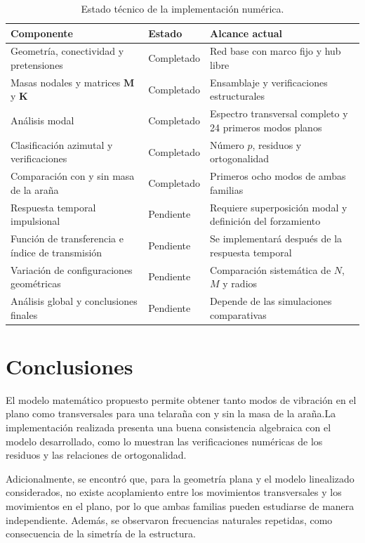 \documentclass[11pt,letterpaper]{article}
\begin{document}
\begin{table}[H]
\centering
\small
\caption{Estado técnico de la implementación numérica.}
\label{tab:estado}
\begin{tabularx}{0.96\textwidth}{@{}X p{2.5cm} X@{}}
\toprule
Componente & Estado & Alcance actual \\
\midrule
Geometría, conectividad y pretensiones & Completado & Red base con marco fijo y hub libre \\
Masas nodales y matrices $\mathbf M$ y $\mathbf K$ & Completado & Ensamblaje y verificaciones estructurales \\
Análisis modal & Completado & Espectro transversal completo y 24 primeros modos planos \\
Clasificación azimutal y verificaciones & Completado & Número $p$, residuos y ortogonalidad \\
Comparación con y sin masa de la araña & Completado & Primeros ocho modos de ambas familias \\
Respuesta temporal impulsional & Pendiente & Requiere superposición modal y definición del forzamiento \\
Función de transferencia e índice de transmisión & Pendiente & Se implementará después de la respuesta temporal \\
Variación de configuraciones geométricas & Pendiente & Comparación sistemática de $N$, $M$ y radios \\
Análisis global y conclusiones finales & Pendiente & Depende de las simulaciones comparativas \\
\bottomrule
\end{tabularx}
\end{table}

\section{Conclusiones}
El modelo matemático propuesto permite obtener tanto modos de vibración en el plano como transversales para una telaraña con y sin la masa de la araña.La implementación realizada presenta una buena consistencia algebraica con el modelo desarrollado, como lo muestran las verificaciones numéricas de los residuos y las relaciones de ortogonalidad.

Adicionalmente, se encontró que,  para la geometría plana y el modelo linealizado considerados, no existe acoplamiento entre los movimientos transversales y los movimientos en el plano, por lo que ambas familias pueden estudiarse de manera independiente. Además, se observaron frecuencias naturales repetidas, como consecuencia de la simetría de la estructura.
\end{document}
